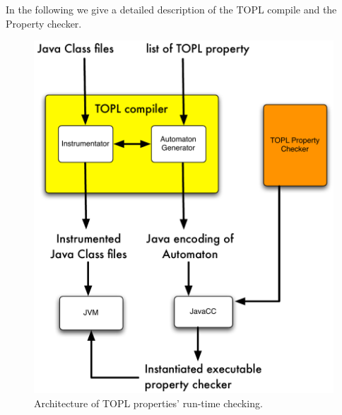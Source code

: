 \documentclass[10pt]{llncs} %
\begin{document}
In the following we give a detailed description of the TOPL compile and the Property checker.
%
\begin{figure}[htbp]
\begin{center}
\includegraphics[scale=.35]{TOPL.pdf}
\caption{Architecture of TOPL properties' run-time checking.}
\label{architecture}
\end{center}
\end{figure}
\end{document}

